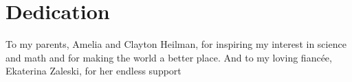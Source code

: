 \chapter*{Dedication}

\begin{center}
\begin{minipage}{0.75\linewidth}
\centering
To my parents, Amelia and Clayton Heilman, for inspiring my interest in science and math and for making the world a better place. And to my loving fiancée, Ekaterina Zaleski, for her endless support
\end{minipage}
\end{center}

